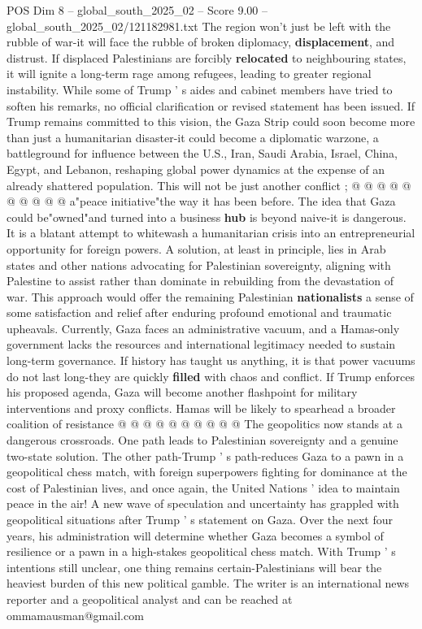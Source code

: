 \begin{textsample}{POS Dim 8 – global\_south\_2025\_02 – Score 9.00 – global\_south\_2025\_02/121182981.txt}
The region won't just be left with the rubble of war-it will face the rubble of broken diplomacy, \textbf{displacement}, and distrust.
If displaced Palestinians are forcibly \textbf{relocated} to neighbouring states, it will ignite a long-term rage among refugees, leading to greater regional instability.
While some of Trump ' s aides and cabinet members have tried to soften his remarks, no official clarification or revised statement has been issued.
If Trump remains committed to this vision, the Gaza Strip could soon become more than just a humanitarian disaster-it could become a diplomatic warzone, a battleground for influence between the U.S., Iran, Saudi Arabia, Israel, China, Egypt, and Lebanon, reshaping global power dynamics at the expense of an already shattered population.
This will not be just another conflict ; @ @ @ @ @ @ @ @ @ @ a"peace initiative"the way it has been before.
The idea that Gaza could be"owned"and turned into a business \textbf{hub} is beyond naive-it is dangerous.
It is a blatant attempt to whitewash a humanitarian crisis into an entrepreneurial opportunity for foreign powers.
A solution, at least in principle, lies in Arab states and other nations advocating for Palestinian sovereignty, aligning with Palestine to assist rather than dominate in rebuilding from the devastation of war.
This approach would offer the remaining Palestinian \textbf{nationalists} a sense of some satisfaction and relief after enduring profound emotional and traumatic upheavals.
Currently, Gaza faces an administrative vacuum, and a Hamas-only government lacks the resources and international legitimacy needed to sustain long-term governance.
If history has taught us anything, it is that power vacuums do not last long-they are quickly \textbf{filled} with chaos and conflict.
If Trump enforces his proposed agenda, Gaza will become another flashpoint for military interventions and proxy conflicts.
Hamas will be likely to spearhead a broader coalition of resistance @ @ @ @ @ @ @ @ @ @ The geopolitics now stands at a dangerous crossroads.
One path leads to Palestinian sovereignty and a genuine two-state solution.
The other path-Trump ' s path-reduces Gaza to a pawn in a geopolitical chess match, with foreign superpowers fighting for dominance at the cost of Palestinian lives, and once again, the United Nations ' idea to maintain peace in the air!
A new wave of speculation and uncertainty has grappled with geopolitical situations after Trump ' s statement on Gaza.
Over the next four years, his administration will determine whether Gaza becomes a symbol of resilience or a pawn in a high-stakes geopolitical chess match.
With Trump ' s intentions still unclear, one thing remains certain-Palestinians will bear the heaviest burden of this new political gamble.
The writer is an international news reporter and a geopolitical analyst and can be reached at ommamausman@gmail.com

\end{textsample}

